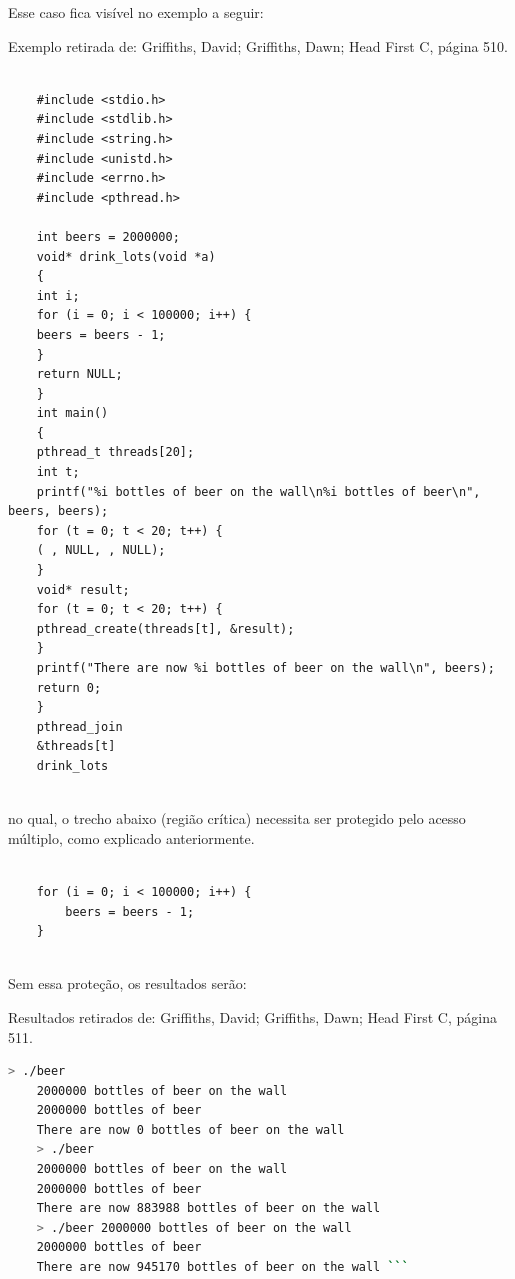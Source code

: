 Esse caso fica visível no exemplo a seguir:

Exemplo retirada de: Griffiths, David; Griffiths, Dawn; Head First C,
página 510.

\begin{verbatim}

    #include <stdio.h>
    #include <stdlib.h>
    #include <string.h>
    #include <unistd.h>
    #include <errno.h>
    #include <pthread.h>
    
    int beers = 2000000;
    void* drink_lots(void *a)
    {
    int i;
    for (i = 0; i < 100000; i++) {
    beers = beers - 1;
    }
    return NULL;
    }
    int main()
    {
    pthread_t threads[20];
    int t;
    printf("%i bottles of beer on the wall\n%i bottles of beer\n", beers, beers);
    for (t = 0; t < 20; t++) {
    ( , NULL, , NULL);
    }
    void* result;
    for (t = 0; t < 20; t++) {
    pthread_create(threads[t], &result);
    }
    printf("There are now %i bottles of beer on the wall\n", beers);
    return 0;
    }
    pthread_join
    &threads[t]
    drink_lots
    
\end{verbatim}


no qual, o trecho abaixo (região crítica) necessita ser protegido pelo
acesso múltiplo, como explicado anteriormente.

\begin{verbatim}

    for (i = 0; i < 100000; i++) {
        beers = beers - 1;
    }
    
\end{verbatim}



Sem essa proteção, os resultados serão:

Resultados retirados de: Griffiths, David; Griffiths, Dawn; Head First
C, página 511.

\begin{lstlisting}[language=bash]
    > ./beer 
    2000000 bottles of beer on the wall 
    2000000 bottles of beer 
    There are now 0 bottles of beer on the wall 
    > ./beer 
    2000000 bottles of beer on the wall 
    2000000 bottles of beer 
    There are now 883988 bottles of beer on the wall 
    > ./beer 2000000 bottles of beer on the wall 
    2000000 bottles of beer 
    There are now 945170 bottles of beer on the wall ```
\end{lstlisting}



